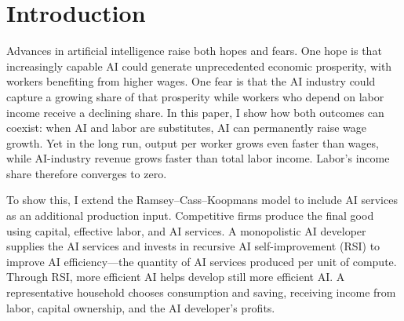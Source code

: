 \section{Introduction}
\label{sec:rewrite-introduction}

Advances in artificial intelligence raise both hopes and fears. One hope is that increasingly capable AI could generate unprecedented economic prosperity, with workers benefiting from higher wages. One fear is that the AI industry could capture a growing share of that prosperity while workers who depend on labor income receive a declining share. In this paper, I show how both outcomes can coexist: when AI and labor are substitutes, AI can permanently raise wage growth. Yet in the long run, output per worker grows even faster than wages, while AI-industry revenue grows faster than total labor income. Labor’s income share therefore converges to zero.

To show this, I extend the Ramsey--Cass--Koopmans model to include AI services as an additional production input. Competitive firms produce the final good using capital, effective labor, and AI services. 
A monopolistic AI developer supplies the AI services and invests in recursive AI self-improvement (RSI) to improve AI efficiency---the quantity of AI services produced per unit of compute. Through RSI, more efficient AI helps develop still more efficient AI. A representative household chooses consumption and saving, receiving income from labor, capital ownership, and the AI developer’s profits.






